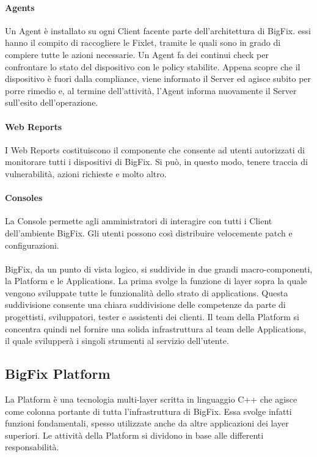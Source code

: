 \paragraph{Agents}
Un Agent è installato su ogni Client facente parte dell'architettura di BigFix. essi hanno il compito di raccogliere le Fixlet, tramite le quali sono in grado di compiere tutte le azioni necessarie. Un Agent fa dei continui check per confrontare lo stato del dispositivo con le policy stabilite. Appena scopre che il dispositivo è fuori dalla compliance, viene informato il Server ed agisce subito per porre rimedio e, al termine dell'attività, l'Agent informa nuovamente il Server sull'esito dell'operazione.
\paragraph{Web Reports}
I Web Reports costituiscono il componente che consente ad utenti autorizzati di monitorare tutti i dispositivi di BigFix. Si può, in questo modo, tenere traccia di vulnerabilità, azioni richieste e molto altro.
\paragraph{Consoles}
La Console permette agli amministratori di interagire con tutti i Client dell'ambiente BigFix. Gli utenti possono così distribuire velocemente patch e configurazioni.
\paragraph{}
BigFix, da un punto di vista logico, si suddivide in due grandi macro-componenti, la Platform e le Applications. La prima svolge la funzione di layer sopra la quale vengono sviluppate tutte le funzionalità dello strato di applications. Questa suddivisione consente una chiara suddivisione delle competenze da parte di progettisti, sviluppatori, tester e assistenti dei clienti. Il team della Platform si concentra quindi nel fornire una solida infrastruttura al team delle Applications, il quale svilupperà i singoli strumenti al servizio dell'utente.
\subsection{BigFix Platform}
La Platform è una tecnologia multi-layer scritta in linguaggio C++ che agisce come colonna portante di tutta l'infrastruttura di BigFix. Essa svolge infatti funzioni fondamentali, spesso utilizzate anche da altre applicazioni dei layer superiori. Le attività della Platform si dividono in base alle differenti responsabilità.
